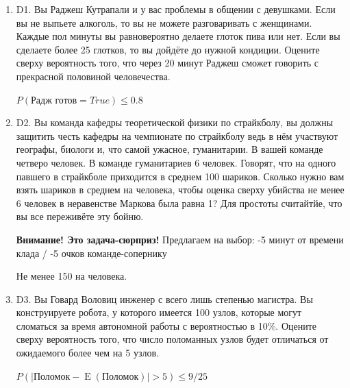 \documentclass[12pt]{article}
\DeclareMathOperator{\E}{E}
\def \P{P}
\newenvironment{problem}{}{}
\newenvironment{sol}{}{} %
\begin{document}
\begin{enumerate}
\begin{problem}
\item[D1.] Вы Раджеш Кутрапали и у вас проблемы в общении с девушками. Если вы не выпьете алкоголь, то вы не можете разговаривать с женщинами. Каждые пол минуты вы равновероятно делаете глоток пива или нет. Если вы сделаете более 25 глотков, то вы дойдёте до нужной кондиции. Оцените сверху вероятность того, что через 20 минут Раджеш сможет говорить с прекрасной половиной человечества. 

\begin{sol}
$\P(\text{Радж готов}=True) \leq 0.8$
\end{sol}
\end{problem}

\begin{problem}
\item[D2.] Вы команда кафедры теоретической физики по страйкболу, вы должны защитить честь кафедры на чемпионате по страйкболу ведь в нём участвуют географы, биологи и, что самой ужасное, гуманитарии. В вашей команде четверо человек. В команде гуманитариев 6 человек. Говорят, что на одного павшего в страйкболе приходится в среднем 100 шариков. Сколько нужно вам взять шариков в среднем на человека, чтобы оценка сверху убийства не менее 6 человек в неравенстве Маркова была равна 1? Для простоты считайтйе, что вы все переживёте эту бойню.

\begin{sol}
\textbf{Внимание! Это задача-сюрприз!} Предлагаем на выбор: -5 минут от времени клада / -5 очков команде-сопернику

Не менее 150 на человека.
\end{sol}
\end{problem}

\begin{problem}
\item[D3.] Вы Говард Воловиц инженер с всего лишь степенью магистра. Вы конструируете робота, у которого имеется 100 узлов, которые могут сломаться за время автономной работы с вероятностью в 10\%. Оцените сверху вероятность того, что число поломанных узлов будет отличаться от ожидаемого более чем на 5 узлов. 

\begin{sol}
$\P(\vert \text{Поломок} - \E(\text{Поломок}) \vert  >5) \leq 9/25$
\end{sol}
\end{problem}


\end{enumerate}
\end{document}
